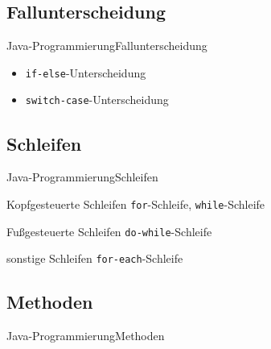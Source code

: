 \subsection{Fallunterscheidung}
\begin{frame}{Java-Programmierung}{Fallunterscheidung}
    \begin{itemize}
        \item\texttt{if-else}-Unterscheidung
        \item\texttt{switch-case}-Unterscheidung
    \end{itemize}
\end{frame}


\subsection{Schleifen}
\begin{frame}{Java-Programmierung}{Schleifen}
    \begin{block}{Kopfgesteuerte Schleifen}
        \texttt{for}-Schleife, \texttt{while}-Schleife
    \end{block}
    \begin{block}{Fußgesteuerte Schleifen}
        \texttt{do-while}-Schleife
    \end{block}
    \begin{block}{sonstige Schleifen}
        \texttt{for-each}-Schleife
    \end{block}
\end{frame}

\subsection{Methoden}
\begin{frame}{Java-Programmierung}{Methoden}
\end{frame}